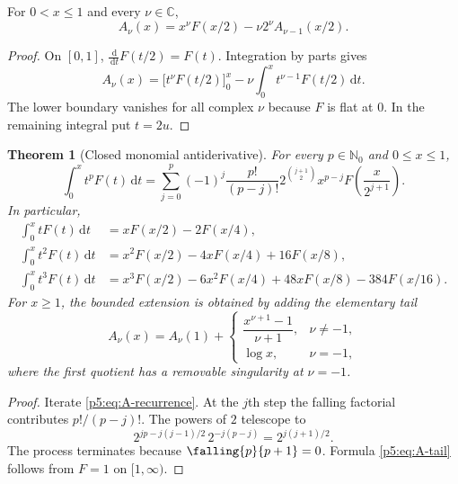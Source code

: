 \documentclass[11pt,oneside]{article}
\newtheorem{theorem}{Theorem}[section]
\theoremstyle{definition}
\theoremstyle{remark}
\newcommand{\C}{\mathbb C}
\newcommand{\N}{\mathbb N}
\newcommand{\dd}{\,\mathrm d}
\newcommand{\1}{\mathbf 1}
\begin{document}
\begin{lemma}\label{p5:lem:A-recurrence}
For $0<x\le1$ and every $\nu\in\C$,
\begin{equation}\label{p5:eq:A-recurrence}
 A_\nu(x)=x^\nu F(x/2)-\nu 2^\nu A_{\nu-1}(x/2).
\end{equation}
\end{lemma}

\begin{proof}
On $[0,1]$, $\frac{\dd}{\dd t}F(t/2)=F(t)$.  Integration by parts gives
\[
 A_\nu(x)=\bigl[t^\nu F(t/2)\bigr]_{0}^{x}
 -\nu\int_0^x t^{\nu-1}F(t/2)\dd t.
\]
The lower boundary vanishes for all complex $\nu$ because $F$ is flat at $0$.  In the remaining integral put $t=2u$.
\end{proof}

\begin{theorem}[Closed monomial antiderivative]\label{p5:thm:integer-weight-antiderivative}
For every $p\in\N_0$ and $0\le x\le1$,
\begin{equation}\label{p5:eq:integer-weight-antiderivative}
\boxed{
 \int_0^x t^pF(t)\dd t
 =\sum_{j=0}^{p}(-1)^j\frac{p!}{(p-j)!}
 2^{\binom{j+1}{2}}x^{p-j}
 F\!\left(\frac{x}{2^{j+1}}\right).}
\end{equation}
In particular,
\begin{align}
\int_0^x tF(t)\dd t
 &=xF(x/2)-2F(x/4),\label{p5:eq:A1}\\
\int_0^x t^2F(t)\dd t
 &=x^2F(x/2)-4xF(x/4)+16F(x/8),\label{p5:eq:A2}\\
\int_0^x t^3F(t)\dd t
 &=x^3F(x/2)-6x^2F(x/4)+48xF(x/8)-384F(x/16).
\end{align}
For $x\ge1$, the bounded extension is obtained by adding the elementary tail
\begin{equation}\label{p5:eq:A-tail}
 A_\nu(x)=A_\nu(1)+
 \begin{cases}
 \dfrac{x^{\nu+1}-1}{\nu+1},&\nu\ne-1,\\[0.7em]
 \log x,&\nu=-1,
 \end{cases}
\end{equation}
where the first quotient has a removable singularity at $\nu=-1$.
\end{theorem}

\begin{proof}
Iterate \eqref{p5:eq:A-recurrence}.  At the $j$th step the falling factorial contributes $p!/(p-j)!$.  The powers of $2$ telescope to
\[
 2^{jp-j(j-1)/2}\,2^{-j(p-j)}=2^{j(j+1)/2}.
\]
The process terminates because $\falling{p}{p+1}=0$.  Formula \eqref{p5:eq:A-tail} follows from $F=1$ on $[1,\infty)$.
\end{proof}
\end{document}
